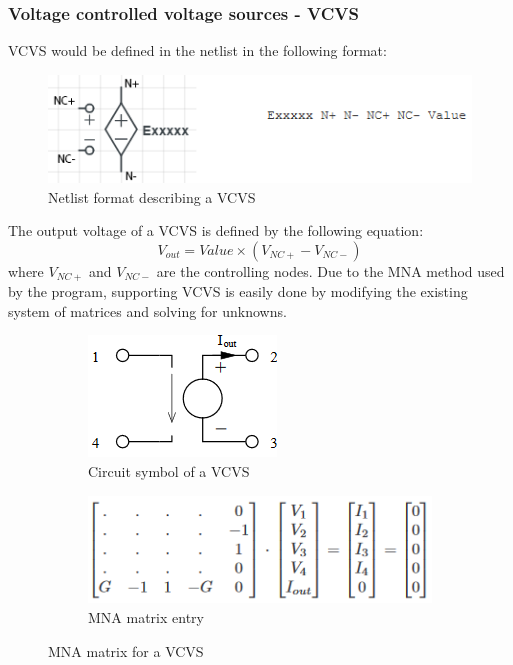 \documentclass[12pt,a4paper]{article}
\begin{document}
\subsubsection{Voltage controlled voltage sources - VCVS}
VCVS would be defined in the netlist in the following format: \par 
\begin{figure} [h!]
	\centering
	\includegraphics[]{E.png}
	\caption{Netlist format describing a VCVS \cite{MNA}}
\end{figure}
The output voltage of a VCVS is defined by the following equation: $$V_{out}=Value \times (V_{NC+}-V_{NC-})$$
where $V_{NC+}$ and $V_{NC-}$ are the controlling nodes. Due to the MNA method used by the program, supporting VCVS is 
easily done by modifying the existing system of matrices and solving for unknowns.

\begin{figure} [h!]
	\centering
	\begin{subfigure}{.5\textwidth}
	  \centering
	  \includegraphics[scale=0.8]{E_diagram.PNG}
	  \caption{Circuit symbol of a VCVS}
	  \label{fig:sub1}
	\end{subfigure}%
	\begin{subfigure}{.5\textwidth}
	  \centering
	  \includegraphics[width= \textwidth]{E_matrices.PNG}
	  \caption{MNA matrix entry}
	  \label{fig:sub2}
	\end{subfigure}
	\caption{MNA matrix for a VCVS \cite{jahn_margraf_habchi_jacob_2003}}
	\label{fig:test}
\end{figure}
\end{document}
